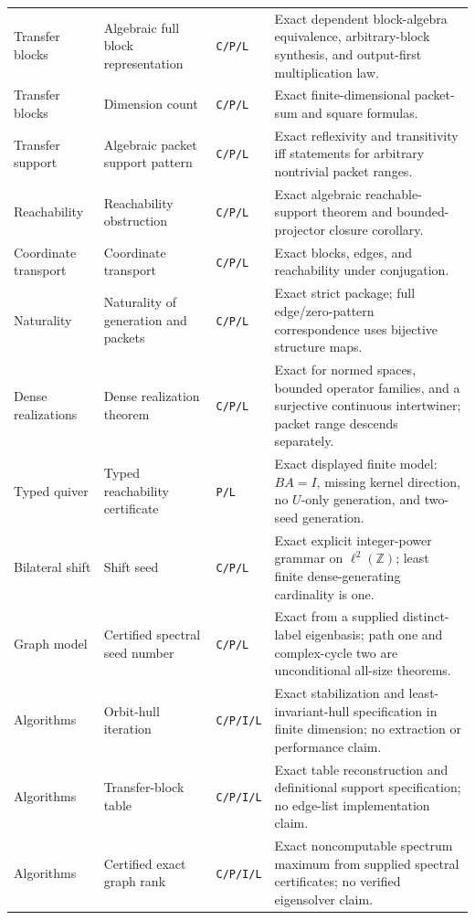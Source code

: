 \documentclass[11pt]{article}
\theoremstyle{definition}
\theoremstyle{remark}
\newcommand{\Z}{\mathbb Z}
\begin{document}
\begin{longtable}{L{0.16\textwidth}L{0.25\textwidth}L{0.10\textwidth}L{0.38\textwidth}}
Transfer blocks & Algebraic full block representation & \texttt{C/P/L} & Exact dependent block-algebra equivalence, arbitrary-block synthesis, and output-first multiplication law. \\
Transfer blocks & Dimension count & \texttt{C/P/L} & Exact finite-dimensional packet-sum and square formulas. \\
Transfer support & Algebraic packet support pattern & \texttt{C/P/L} & Exact reflexivity and transitivity iff statements for arbitrary nontrivial packet ranges. \\
Reachability & Reachability obstruction & \texttt{C/P/L} & Exact algebraic reachable-support theorem and bounded-projector closure corollary. \\
Coordinate transport & Coordinate transport & \texttt{C/P/L} & Exact blocks, edges, and reachability under conjugation. \\
Naturality & Naturality of generation and packets & \texttt{C/P/L} & Exact strict package; full edge/zero-pattern correspondence uses bijective structure maps. \\
Dense realizations & Dense realization theorem & \texttt{C/P/L} & Exact for normed spaces, bounded operator families, and a surjective continuous intertwiner; packet range descends separately. \\
Typed quiver & Typed reachability certificate & \texttt{P/L} & Exact displayed finite model: $BA=I$, missing kernel direction, no $U$-only generation, and two-seed generation. \\
Bilateral shift & Shift seed & \texttt{C/P/L} & Exact explicit integer-power grammar on $\ell^2(\Z)$; least finite dense-generating cardinality is one. \\
Graph model & Certified spectral seed number & \texttt{C/P/L} & Exact from a supplied distinct-label eigenbasis; path one and complex-cycle two are unconditional all-size theorems. \\
Algorithms & Orbit-hull iteration & \texttt{C/P/I/L} & Exact stabilization and least-invariant-hull specification in finite dimension; no extraction or performance claim. \\
Algorithms & Transfer-block table & \texttt{C/P/I/L} & Exact table reconstruction and definitional support specification; no edge-list implementation claim. \\
Algorithms & Certified exact graph rank & \texttt{C/P/I/L} & Exact noncomputable spectrum maximum from supplied spectral certificates; no verified eigensolver claim. \\
\bottomrule
\end{longtable}
\endgroup
\end{document}
